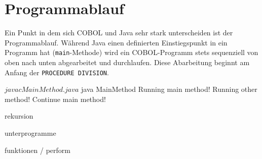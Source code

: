 \section{Programmablauf}
Ein Punkt in dem sich COBOL und Java sehr stark unterscheiden ist der Programmablauf. Während Java einen definierten Einstiegspunkt in ein Programm hat (\texttt{main}-Methode) wird ein COBOL-Programm stets sequenziell von oben nach unten abgearbeitet und durchlaufen. Diese Abarbeitung beginnt am Anfang der \texttt{PROCEDURE DIVISION}.

\sepCodeAndOutput
\begin{shellwindow}
$ javac MainMethod.java 
$ java MainMethod
Running main method!
Running other method!
Continue main method!
\end{shellwindow}

rekursion

unterprogramme

funktionen / perform
